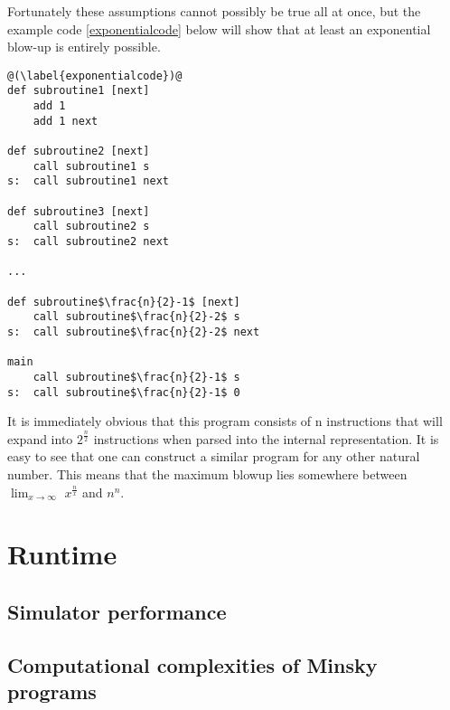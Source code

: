 Fortunately these assumptions cannot possibly be true all at once, but the example code \ref{exponentialcode} below will show that at least an exponential blow-up is entirely possible.
\begin{lstlisting}[frame=single, caption=code resulting in exponential blow-up]
@(\label{exponentialcode})@
def subroutine1 [next]
	add 1
	add 1 next

def subroutine2 [next]
	call subroutine1 s
s:	call subroutine1 next

def subroutine3 [next]
	call subroutine2 s
s:	call subroutine2 next

...

def subroutine$\frac{n}{2}-1$ [next]
	call subroutine$\frac{n}{2}-2$ s
s:	call subroutine$\frac{n}{2}-2$ next

main
	call subroutine$\frac{n}{2}-1$ s
s:	call subroutine$\frac{n}{2}-1$ 0
\end{lstlisting}
It is immediately obvious that this program consists of n instructions that will expand into $2^{\frac{n}{2}}$ instructions when parsed into the internal representation. It is easy to see that one can construct a similar program for any other natural number.
This means that the maximum blowup lies somewhere between $\lim_{x\to\infty}$ $x^{\frac{n}{x}}$ and $n^{n}$.
\section{Runtime}
\subsection{Simulator performance}
\subsection{Computational complexities of Minsky programs}
